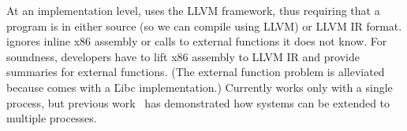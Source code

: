 At an implementation level, \peregrine uses the LLVM framework, thus requiring
that a program is in either source (so we can compile using LLVM) or LLVM
IR format.  \peregrine ignores inline x86 assembly or calls to external
functions it does not know.  For soundness, developers have to lift x86
assembly to LLVM IR and provide summaries for external functions.  (The
external function problem is alleviated because \klee comes with a
\v{Libc} implementation.)  Currently \peregrine works only with a single process,
but previous work~\cite{dos:osdi10} has demonstrated how \dmt systems can
be extended to multiple processes.








